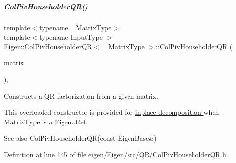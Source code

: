 \mbox{\label{group___q_r___module_a65782010a93a4c9ef4a9191ac8fe30bc}} 
\subparagraph{\texorpdfstring{Col\+Piv\+Householder\+Q\+R()}{ColPivHouseholderQR()}\hspace{0.1cm}{\footnotesize\ttfamily [4/8]}}
{\footnotesize\ttfamily template$<$typename \+\_\+\+Matrix\+Type$>$ \\
template$<$typename Input\+Type $>$ \\
\hyperlink{group___q_r___module_class_eigen_1_1_col_piv_householder_q_r}{Eigen\+::\+Col\+Piv\+Householder\+QR}$<$ \+\_\+\+Matrix\+Type $>$\+::\hyperlink{group___q_r___module_class_eigen_1_1_col_piv_householder_q_r}{Col\+Piv\+Householder\+QR} (\begin{DoxyParamCaption}\item[{\hyperlink{group___core___module_struct_eigen_1_1_eigen_base}{Eigen\+Base}$<$ Input\+Type $>$ \&}]{matrix }\end{DoxyParamCaption})\hspace{0.3cm}{\ttfamily [inline]}, {\ttfamily [explicit]}}



Constructs a QR factorization from a given matrix. 

This overloaded constructor is provided for \hyperlink{group___inplace_decomposition}{inplace decomposition } when {\ttfamily Matrix\+Type} is a \hyperlink{group___core___module_class_eigen_1_1_ref}{Eigen\+::\+Ref}.

\begin{DoxySeeAlso}{See also}
Col\+Piv\+Householder\+Q\+R(const Eigen\+Base\&) 
\end{DoxySeeAlso}


Definition at line \hyperlink{eigen_2_eigen_2src_2_q_r_2_col_piv_householder_q_r_8h_source_l00145}{145} of file \hyperlink{eigen_2_eigen_2src_2_q_r_2_col_piv_householder_q_r_8h_source}{eigen/\+Eigen/src/\+Q\+R/\+Col\+Piv\+Householder\+Q\+R.\+h}.

